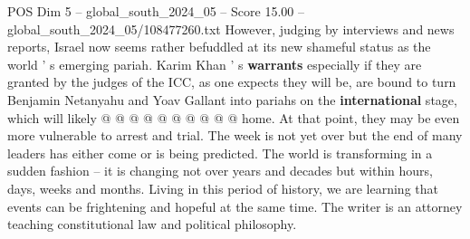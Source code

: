 \begin{textsample}{POS Dim 5 – global\_south\_2024\_05 – Score 15.00 – global\_south\_2024\_05/108477260.txt}
However, judging by interviews and news reports, Israel now seems rather befuddled at its new shameful status as the world ' s emerging pariah.
Karim Khan ' s \textbf{warrants} especially if they are granted by the judges of the ICC, as one expects they will be, are bound to turn Benjamin Netanyahu and Yoav Gallant into pariahs on the \textbf{international} stage, which will likely @ @ @ @ @ @ @ @ @ @ home.
At that point, they may be even more vulnerable to arrest and trial.
The week is not yet over but the end of many leaders has either come or is being predicted.
The world is transforming in a sudden fashion -- it is changing not over years and decades but within hours, days, weeks and months.
Living in this period of history, we are learning that events can be frightening and hopeful at the same time.
The writer is an attorney teaching constitutional law and political philosophy.

\end{textsample}
